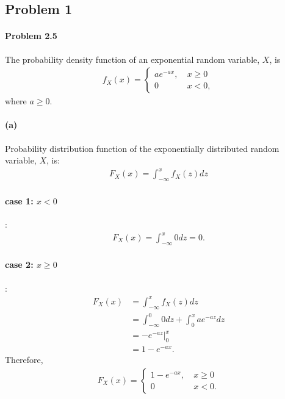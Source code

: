 \subsection*{Problem 1}
\paragraph{Problem 2.5} The probability density function of an exponential random variable, $X$, is
\begin{align*}
	f_X(x) = \begin{cases}
		a e^{-ax}, &\ x \geq 0\\
		0 &\ x < 0, 
	\end{cases}
\end{align*}
where $a \geq 0$.
\paragraph{(a)} Probability distribution function of the exponentially distributed random variable, $X$, is:
\begin{align*}
	F_X(x) = \int_{-\infty}^{x} f_X(z)dz
\end{align*}
\paragraph{case 1: $x < 0$}:
\begin{align*}
	F_X(x) = \int_{-\infty}^{x} 0 dz = 0.
\end{align*}
\paragraph{case 2: $x \geq 0$}:
\begin{align*}
	F_X(x) &= \int_{-\infty}^{x} f_X(z)dz\\
	&= \int_{-\infty}^{0}0 dz + \int_{0}^{x} ae^{-az}dz\\
	&= - e^{-az} \Big|_{0}^{x}\\
	&= 1-e^{-ax}.
\end{align*}
Therefore,
\begin{align*}
	F_X(x) = \begin{cases}
		1-e^{-ax}, &\ x \geq 0\\
		0 &\ x <0.
	\end{cases}
\end{align*}
